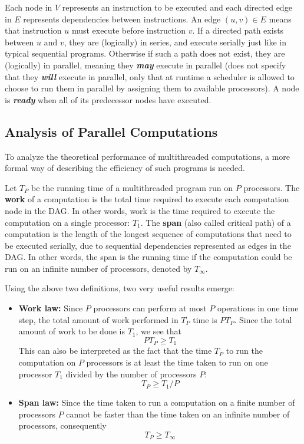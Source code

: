 \documentclass[bsc,frontabs,singlespacing,parskip,deptreport,normalheadings]{infthesis}
\begin{document}
Each node in \(V\) represents an instruction to be executed and each directed
edge in \(E\) represents dependencies between instructions. An edge \((u,v) \in
E\) means that instruction \(u\) must execute before instruction \(v\). If a
directed path exists between \(u\) and \(v\), they are (logically) in series,
and execute serially just like in typical sequential programs. Otherwise if such
a path does not exist, they are (logically) in parallel, meaning they
\textit{\textbf{may}} execute in parallel (does not specify that they
\textit{\textbf{will}} execute in parallel, only that at runtime a scheduler is
allowed to choose to run them in parallel by assigning them to available
processors). A node is \textbf{\textit{ready}} when all of its predecessor nodes
have executed.

\subsection{Analysis of Parallel Computations}
\label{subsection:analysis_of_parallel_computations}

To analyze the theoretical performance of multithreaded computations, a more
formal way of describing the efficiency of such programs is needed.

Let \(T_P\) be the running time of a multithreaded program run on \(P\)
processors. The \textbf{work} of a computation is the total time required to
execute each computation node in the DAG. In other words, work is the time
required to execute the computation on a single processor: \(T_1\). The
\textbf{span} (also called critical path) of a computation is the length of the
longest sequence of computations that need to be executed serially, due to
sequential dependencies represented as edges in the DAG. In other words, the
span is the running time if the computation could be run on an infinite number
of processors, denoted by \(T_\infty\).

Using the above two definitions, two very useful results emerge:

\begin{itemize}
    \item \textbf{Work law:} Since \(P\) processors can perform at most
        \(P\) operations in one time step, the total amount of work
        performed in \(T_P\) time is \(P T_P\). Since the total amount of
        work to be done is \(T_1\), we see that \[P T_P \geq T_1\] This can
        also be interpreted as the fact that the time \(T_P\) to run the
        computation on \(P\) processors is at least the time taken to run on
        one processor \(T_1\) divided by the number of processors \(P\):
        \[T_P \geq T_1 / P\]
    \item \textbf{Span law:} Since the time taken to run a computation on a
        finite number of processors \(P\) cannot be faster than the time
        taken on an infinite number of processors, consequently \[T_P \geq
        T_\infty\]
\end{itemize}
\end{document}
